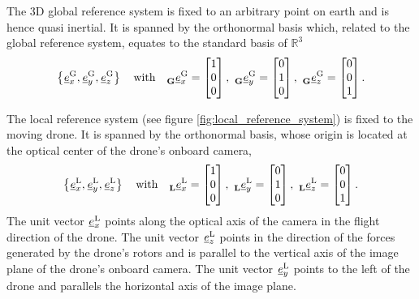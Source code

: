 The 3D global reference system
is fixed to an arbitrary point on earth
and is hence quasi inertial.
It is spanned by the orthonormal basis
which, related to the global reference system,
equates to the standard basis of $\mathbb{R}^3$
\begin{equation}
    \left\{
        \unitvec[]{\text G}{x}{}{},
        \unitvec[]{\text G}{y}{}{},
        \unitvec[]{\text G}{z}{}{}
    \right\}
    \quad \text{with} \quad 
    \unitvec[]{\text G}{x}{\grs}{} = \begin{bmatrix} 1 \\ 0 \\ 0 \end{bmatrix},\ 
    \unitvec[]{\text G}{y}{\grs}{} = \begin{bmatrix} 0 \\ 1 \\ 0 \end{bmatrix},\ 
    \unitvec[]{\text G}{z}{\grs}{} = \begin{bmatrix} 0 \\ 0 \\ 1 \end{bmatrix}.
\end{equation}


The local reference system (see figure \ref{fig:local_reference_system}) is fixed to the moving drone.
It is spanned by the orthonormal basis,
whose origin is located at the optical center of the drone's onboard camera,
\begin{equation}
    \left\{
        \unitvec[]{\text L}{x}{}{},
        \unitvec[]{\text L}{y}{}{},
        \unitvec[]{\text L}{z}{}{}
    \right\}
    \quad \text{with} \quad 
    \unitvec[]{\text L}{x}{\lrs}{} = \begin{bmatrix} 1 \\ 0 \\ 0 \end{bmatrix},\ 
    \unitvec[]{\text L}{y}{\lrs}{} = \begin{bmatrix} 0 \\ 1 \\ 0 \end{bmatrix},\ 
    \unitvec[]{\text L}{z}{\lrs}{} = \begin{bmatrix} 0 \\ 0 \\ 1 \end{bmatrix}.
\end{equation}
The unit vector 
$\unitvec[]{\text L}{x}{}{}$ 
points along the optical axis of the camera
in the flight direction of the drone.
The unit vector
$\unitvec[]{\text L}{z}{}{}$ 
points in the direction of the forces generated by the drone's rotors
and is parallel to the vertical axis of the image plane of the drone's onboard camera.
The unit vector 
$\unitvec[]{\text L}{y}{}{}$ 
points to the left of the drone
and parallels the horizontal axis of the image plane.






